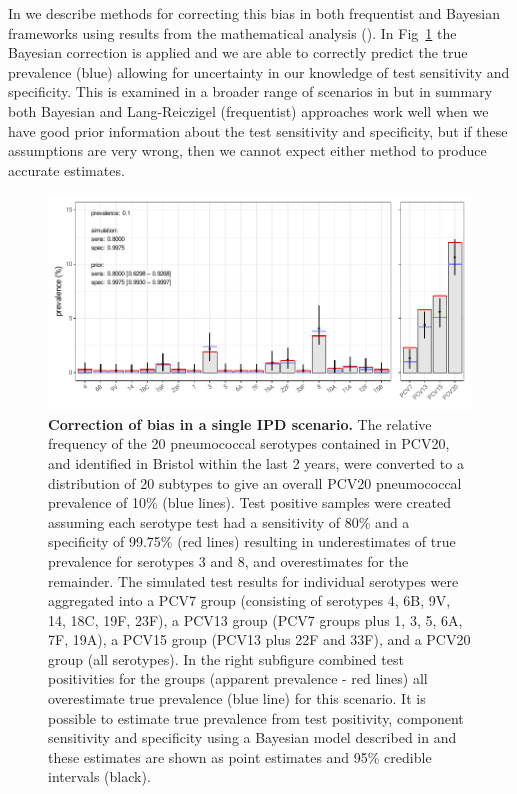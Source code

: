 \documentclass[10pt,letterpaper]{article}
\begin{document}
In  we describe methods for correcting this bias in both frequentist and Bayesian frameworks using results from the mathematical analysis (). In Fig~\ref{fig5} the Bayesian correction is applied and we are able to correctly predict the true prevalence (blue) allowing for uncertainty in our knowledge of test sensitivity and specificity. This is examined in a broader range of scenarios in  but in summary both Bayesian and Lang-Reiczigel (frequentist) approaches work well when we have good prior information about the test sensitivity and specificity, but if these assumptions are very wrong, then we cannot expect either method to produce accurate estimates.

\begin{figure}[h!]
\centerline{\includegraphics{fig/simulation_result_bayes.pdf}}
\caption{{\bf Correction of bias in a single IPD scenario.}
The relative frequency of the 20 pneumococcal serotypes contained in PCV20, and identified in Bristol within the last 2 years, were converted to a distribution of 20 subtypes to give an overall PCV20 pneumococcal prevalence of 10\% (blue lines). Test positive samples were created assuming each serotype test had a sensitivity of 80\% and a specificity of 99.75\% (red lines) resulting in underestimates of true prevalence for serotypes 3 and 8, and overestimates for the remainder. The simulated test results for individual serotypes were aggregated into a PCV7 group (consisting of serotypes 4, 6B, 9V, 14, 18C, 19F, 23F), a PCV13 group (PCV7 groups plus 1, 3, 5, 6A, 7F, 19A), a PCV15 group (PCV13 plus 22F and 33F), and a PCV20 group (all serotypes). In the right subfigure combined test positivities for the groups (apparent prevalence - red lines) all overestimate true prevalence (blue line) for this scenario. It is possible to estimate true prevalence from test positivity, component sensitivity and specificity using a Bayesian model described in  and these estimates are shown as point estimates and 95\% credible intervals (black).}
\label{fig5}
\end{figure}
\end{document}
